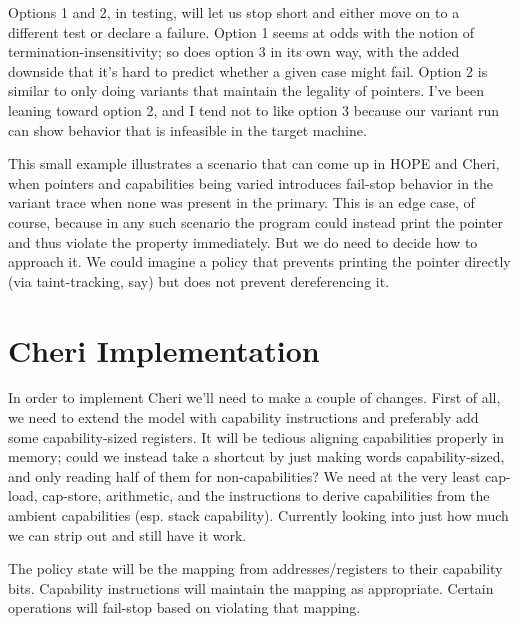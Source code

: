 \documentclass{article}
\begin{document}
Options 1 and 2, in testing, will let us stop short and either move on to a different test or
declare a failure. Option 1 seems at odds with the notion of termination-insensitivity; so does option 3
in its own way, with the added downside that it's hard to predict whether a given case might fail. Option
2 is similar to only doing variants that maintain the legality of pointers. I've been leaning toward option
2, and I tend not to like option 3 because our variant run can show behavior that is infeasible in the
target machine.

This small example illustrates a scenario that can come up in HOPE and Cheri, when pointers and capabilities
being varied introduces fail-stop behavior in the variant trace when none was present in the primary. This
is an edge case, of course, because in any such scenario the program could instead print the pointer and thus
violate the property immediately. But we do need to decide how to approach it. We could imagine a policy that
prevents printing the pointer directly (via taint-tracking, say) but does not prevent dereferencing it.

\section{Cheri Implementation}

In order to implement Cheri we'll need to make a couple of changes. First of all, we need to extend the model
with capability instructions and preferably add some capability-sized registers. It will be tedious aligning
capabilities properly in memory; could we instead take a shortcut by just making words capability-sized, and
only reading half of them for non-capabilities? We need at the very least cap-load, cap-store, arithmetic,
and the instructions to derive capabilities from the ambient capabilities (esp. stack capability). Currently
looking into just how much we can strip out and still have it work.

The policy state will be the mapping from addresses/registers to their capability bits. Capability instructions
will maintain the mapping as appropriate. Certain operations will fail-stop based on violating that mapping.
\end{document}
